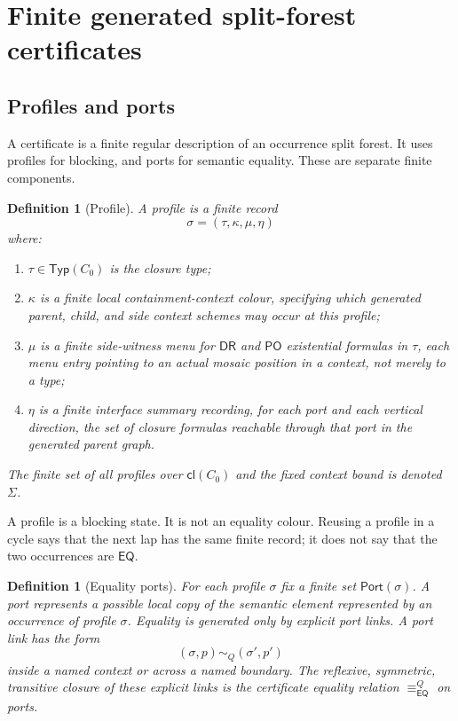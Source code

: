 \documentclass[11pt]{article}
\newtheorem{definition}[theorem]{Definition}
\newcommand{\EQ}{\mathsf{EQ}}
\newcommand{\DR}{\mathsf{DR}}
\newcommand{\PO}{\mathsf{PO}}
\newcommand{\Cl}{\mathsf{cl}}
\newcommand{\Typ}{\mathsf{Typ}}
\newcommand{\Port}{\mathsf{Port}}
\newcommand{\eqc}{\equiv_{\EQ}}
\begin{document}
\section{Finite generated split-forest certificates}
\label{sec:certificates}

\subsection{Profiles and ports}

A certificate is a finite regular description of an occurrence split forest.  It uses profiles for blocking, and ports for semantic equality.  These are separate finite components.

\begin{definition}[Profile]
A profile is a finite record
\[
  \sigma=(\tau,\kappa,\mu,\eta)
\]
where:
\begin{enumerate}[label=(P\arabic*)]
\item $\tau\in\Typ(C_0)$ is the closure type;
\item $\kappa$ is a finite local containment-context colour, specifying which generated parent, child, and side context schemes may occur at this profile;
\item $\mu$ is a finite side-witness menu for $\DR$ and $\PO$ existential formulas in $\tau$, each menu entry pointing to an actual mosaic position in a context, not merely to a type;
\item $\eta$ is a finite interface summary recording, for each port and each vertical direction, the set of closure formulas reachable through that port in the generated parent graph.
\end{enumerate}
The finite set of all profiles over $\Cl(C_0)$ and the fixed context bound is denoted $\Sigma$.
\end{definition}

A profile is a blocking state.  It is not an equality colour.  Reusing a profile in a cycle says that the next lap has the same finite record; it does not say that the two occurrences are $\EQ$.

\begin{definition}[Equality ports]
For each profile $\sigma$ fix a finite set $\Port(\sigma)$.  A port represents a possible local copy of the semantic element represented by an occurrence of profile $\sigma$.  Equality is generated only by explicit port links.  A port link has the form
\[
  (\sigma,p) \sim_Q (\sigma',p')
\]
inside a named context or across a named boundary.  The reflexive, symmetric, transitive closure of these explicit links is the certificate equality relation $\eqc^{Q}$ on ports.
\end{definition}
\end{document}
